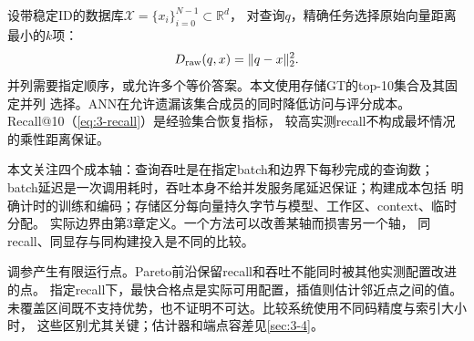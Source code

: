 设带稳定ID的数据库$\mathcal X=\{x_i\}_{i=0}^{N-1}\subset\mathbb R^d$，
对查询$q$，精确任务选择原始向量距离最小的$k$项：
\begin{equation}
 D_{\mathrm{raw}}(q,x)=\|q-x\|_2^2.
 \label{eq:2-raw}
\end{equation}
并列需要指定顺序，或允许多个等价答案。本文使用存储GT的top-10集合及其固定并列
选择。ANN在允许遗漏该集合成员的同时降低访问与评分成本。
Recall@10（\cref{eq:3-recall}）是经验集合恢复指标，
较高实测recall不构成最坏情况的乘性距离保证。

本文关注四个成本轴：查询吞吐是在指定batch和边界下每秒完成的查询数；
batch延迟是一次调用耗时，吞吐本身不给并发服务尾延迟保证；构建成本包括
明确计时的训练和编码；存储区分每向量持久字节与模型、工作区、context、临时分配。
实际边界由第3章定义。一个方法可以改善某轴而损害另一个轴，
同recall、同显存与同构建投入是不同的比较。

调参产生有限运行点。Pareto前沿保留recall和吞吐不能同时被其他实测配置改进的点。
指定recall下，最快合格点是实际可用配置，插值则估计邻近点之间的值。
未覆盖区间既不支持优势，也不证明不可达。比较系统使用不同码精度与索引大小时，
这些区别尤其关键；估计器和端点容差见\cref{sec:3-4}。
